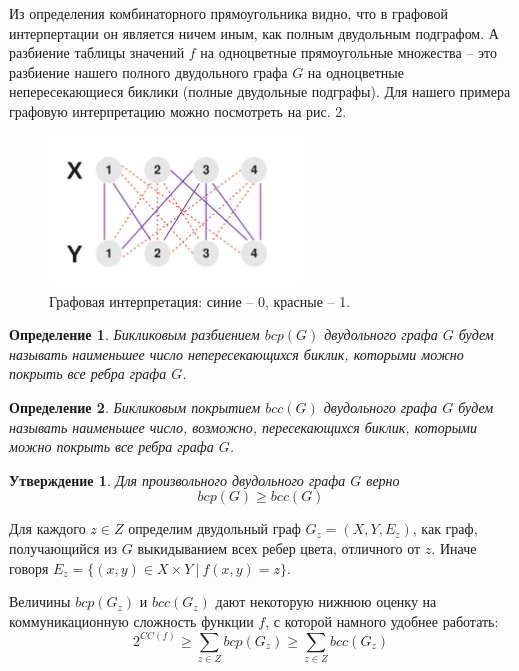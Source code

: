 \documentclass[a4paper]{article}
\newtheorem*{mclaim}{Утверждение}
\newtheorem*{mdefinition}{Определение}
\begin{document}
Из определения комбинаторного прямоугольника видно, что в графовой интерпертации он является ничем
иным, как полным двудольным подграфом. А разбиение таблицы значений $f$ на одноцветные прямоугольные
множества -- это разбиение нашего  полного двудольного графа $G$ на одноцветные непересекающиеся биклики 
(полные двудольные подграфы). Для нашего примера графовую интерпретацию можно посмотреть на рис. 2.

\begin{figure}
	\centering
	\includegraphics[width=0.6\textwidth]{images/biclique.png}
	\caption{Графовая интерпретация: синие -- 0, красные -- 1.}
\end{figure}

\begin{mdefinition}
	Бикликовым разбиением $bcp(G)$ двудольного графа $G$ будем называть наименьшее число непересекающихся
	биклик, которыми можно покрыть все ребра графа $G$.
\end{mdefinition}


\begin{mdefinition}
	Бикликовым покрытием $bcc(G)$ двудольного графа $G$ будем называть наименьшее число, возможно, 
	пересекающихся биклик, которыми можно покрыть все ребра графа $G$.
\end{mdefinition}

\begin{mclaim}
    Для произвольного двудольного графа $G$ верно $$bcp(G) \geq bcc(G)$$
\end{mclaim}

Для каждого $z \in Z$ определим двудольный граф $G_z = (X, Y, E_z)$, как граф, получающийся из $G$ 
выкидыванием всех ребер цвета, отличного от $z$. Иначе говоря $E_z = \{(x,y)\in X\times Y\ |\ f(x, y) = z \}$.

Величины $bcp(G_z)$ и $bcc(G_z)$ дают некоторую нижнюю оценку на коммуникационную сложность функции $f$, 
с которой намного удобнее работать: $$2^{CC(f)}\geq \sum\limits_{z\in Z}bcp(G_z)\geq \sum\limits_{z\in Z}bcc(G_z)$$
\end{document}
